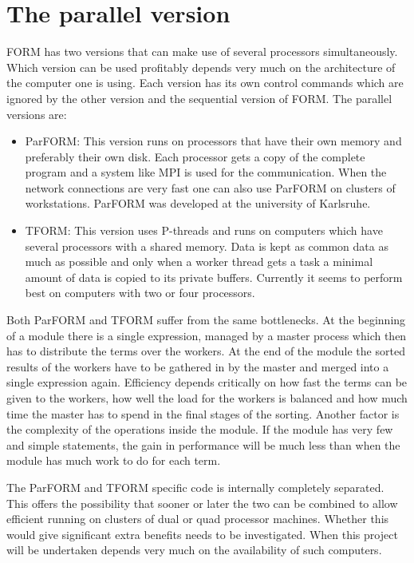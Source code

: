 
\chapter{The parallel version}
\label{parallel}


FORM has two versions that can make use of several processors 
simultaneously. Which version can be used profitably depends very much on 
the architecture of the computer one is using. Each version has its own 
control commands which are ignored by the other version and the sequential 
version of FORM. The parallel versions are:
\begin{itemize}
\item ParFORM: This version runs on processors that have 
their own memory and preferably their own disk. Each processor gets a copy 
of the complete program and a system like MPI is used for the 
communication. When the network connections are very 
fast one can also use ParFORM on clusters of workstations. ParFORM was 
developed at the university of Karlsruhe.
\item TFORM: This version uses P-threads and runs on computers 
which have several processors with a shared memory. Data is kept as common 
data as much as possible and only when a worker thread gets a task a 
minimal amount of data is copied to its private buffers. Currently it seems 
to perform best on computers with two or four processors.
\end{itemize}
Both ParFORM and TFORM suffer from the same bottlenecks. 
At the beginning of a module there is a single expression, managed by a 
master process which then has to distribute the terms over the workers. At 
the end of the module the sorted results of the workers have to be gathered 
in by the master and merged into a single expression again. 
Efficiency depends critically on how fast the terms can be given to the 
workers, how well the load for the workers is balanced and 
how much time the master has to spend in the final stages of the sorting. 
Another factor is the complexity of the operations inside the module. If 
the module has very few and simple statements, the gain in performance will 
be much less than when the module has much work to do for each term.

The ParFORM and TFORM specific code is internally completely separated. 
This offers the possibility that sooner or later the two can be combined to 
allow efficient running on clusters of dual or quad processor machines. 
Whether this would give significant extra benefits needs to be 
investigated. When this project will be undertaken depends very much on the 
availability of such computers.

